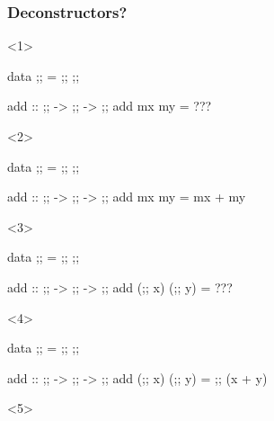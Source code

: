 \documentclass[17pt]{beamer}
\renewcommand{\(}[1]{\begin{columns}[#1]}
\renewcommand{\)}{\end{columns}}
\newcommand{\<}[1]{\begin{column}{#1}}
\renewcommand{\>}{\end{column}}
\begin{document}
\begin{frame}[fragile]
\frametitle{Deconstructors?}
\begin{minipage}[t][.4\textheight]{\textwidth}
\begin{onlyenv}<1>
  \begin{code}
    data ;; = ;; ;;

    add :: ;; -> ;; -> ;;
    add mx my = ???
  \end{code}
\end{onlyenv}
\begin{onlyenv}<2>
  \begin{code}
    data ;; = ;; ;;

    add :: ;; -> ;; -> ;;
    add mx my = mx + my
  \end{code}
\end{onlyenv}
\begin{onlyenv}<3>
  \begin{code}
    data ;; = ;; ;;

    add :: ;; -> ;; -> ;;
    add (;; x) (;; y) = ???
  \end{code}
\end{onlyenv}
\begin{onlyenv}<4>
  \begin{code}
    data ;; = ;; ;;

    add :: ;; -> ;; -> ;;
    add (;; x) (;; y) = ;; (x + y)
  \end{code}%
\end{onlyenv}
\begin{onlyenv}<5>
\end{onlyenv}
\end{minipage}
\begin{minipage}[c][.3\textheight]{\textwidth}
\begin{center}
\end{center}
\end{minipage}
\end{frame}
\end{document}
